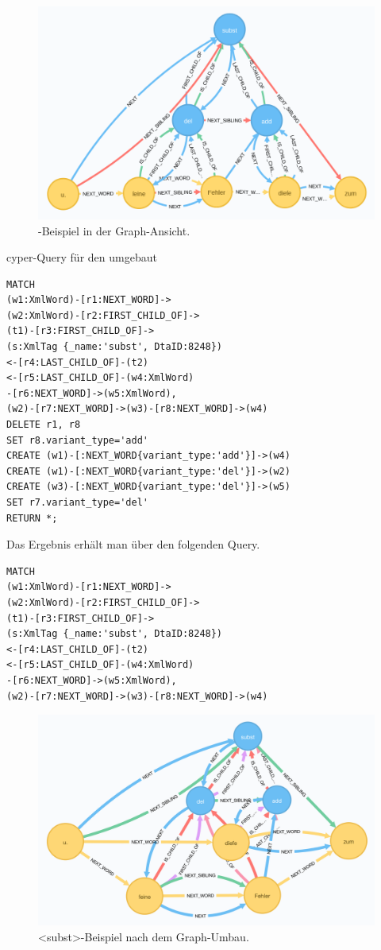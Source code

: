 \documentclass[ngerman,]{scrreprt}
\begin{document}
\begin{figure}
\centering
\includegraphics{Bilder/TEI2Graph/subst-graph-1.png}
\caption{-Beispiel in der Graph-Ansicht.}
\end{figure}

cyper-Query für den umgebaut

\begin{verbatim}
MATCH
(w1:XmlWord)-[r1:NEXT_WORD]->
(w2:XmlWord)-[r2:FIRST_CHILD_OF]->
(t1)-[r3:FIRST_CHILD_OF]->
(s:XmlTag {_name:'subst', DtaID:8248})
<-[r4:LAST_CHILD_OF]-(t2)
<-[r5:LAST_CHILD_OF]-(w4:XmlWord)
-[r6:NEXT_WORD]->(w5:XmlWord),
(w2)-[r7:NEXT_WORD]->(w3)-[r8:NEXT_WORD]->(w4)
DELETE r1, r8
SET r8.variant_type='add'
CREATE (w1)-[:NEXT_WORD{variant_type:'add'}]->(w4)
CREATE (w1)-[:NEXT_WORD{variant_type:'del'}]->(w2)
CREATE (w3)-[:NEXT_WORD{variant_type:'del'}]->(w5)
SET r7.variant_type='del'
RETURN *;
\end{verbatim}

Das Ergebnis erhält man über den folgenden Query.

\begin{verbatim}
MATCH
(w1:XmlWord)-[r1:NEXT_WORD]->
(w2:XmlWord)-[r2:FIRST_CHILD_OF]->
(t1)-[r3:FIRST_CHILD_OF]->
(s:XmlTag {_name:'subst', DtaID:8248})
<-[r4:LAST_CHILD_OF]-(t2)
<-[r5:LAST_CHILD_OF]-(w4:XmlWord)
-[r6:NEXT_WORD]->(w5:XmlWord),
(w2)-[r7:NEXT_WORD]->(w3)-[r8:NEXT_WORD]->(w4)
\end{verbatim}

\begin{figure}
\centering
\includegraphics{Bilder/TEI2Graph/subst-add-del-bearbeitet.png}
\caption{\textless{}subst\textgreater{}-Beispiel nach dem Graph-Umbau.}
\end{figure}
\end{document}
